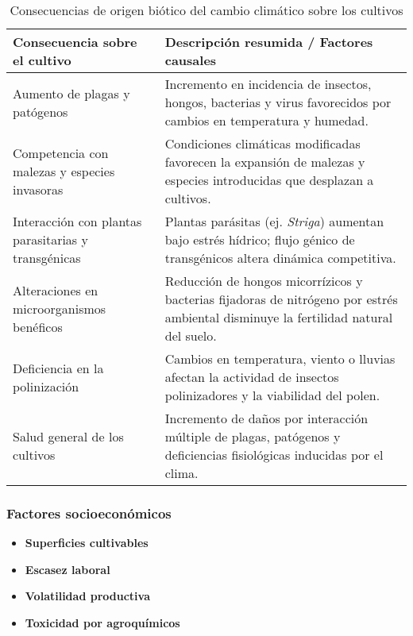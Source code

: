 \begin{table}[ht]
	\centering
	\caption{Consecuencias de origen biótico del cambio climático sobre los cultivos}
	\begin{tabularx}{\textwidth}{|l|X|}
		\hline
		\textbf{Consecuencia sobre el cultivo} & \textbf{Descripción resumida / Factores causales} \\ \hline
		Aumento de plagas y patógenos & Incremento en incidencia de insectos, hongos, bacterias y virus favorecidos por cambios en temperatura y humedad. \\ \hline
		Competencia con malezas y especies invasoras & Condiciones climáticas modificadas favorecen la expansión de malezas y especies introducidas que desplazan a cultivos. \\ \hline
		Interacción con plantas parasitarias y transgénicas & Plantas parásitas (ej. \textit{Striga}) aumentan bajo estrés hídrico; flujo génico de transgénicos altera dinámica competitiva. \\ \hline
		Alteraciones en microorganismos benéficos & Reducción de hongos micorrízicos y bacterias fijadoras de nitrógeno por estrés ambiental disminuye la fertilidad natural del suelo. \\ \hline
		Deficiencia en la polinización & Cambios en temperatura, viento o lluvias afectan la actividad de insectos polinizadores y la viabilidad del polen. \\ \hline
		Salud general de los cultivos & Incremento de daños por interacción múltiple de plagas, patógenos y deficiencias fisiológicas inducidas por el clima. \\ \hline
	\end{tabularx}
\end{table}


\subsubsection{Factores socioeconómicos}
\begin{itemize}[leftmargin=0cm, itemsep=0.5 cm]
\item[]\textbf{Superficies cultivables\\}
\item[]\textbf{Escasez laboral\\}
\item[]\textbf{Volatilidad productiva\\}
\item[]\textbf{Toxicidad por agroquímicos\\}
\end{itemize}

